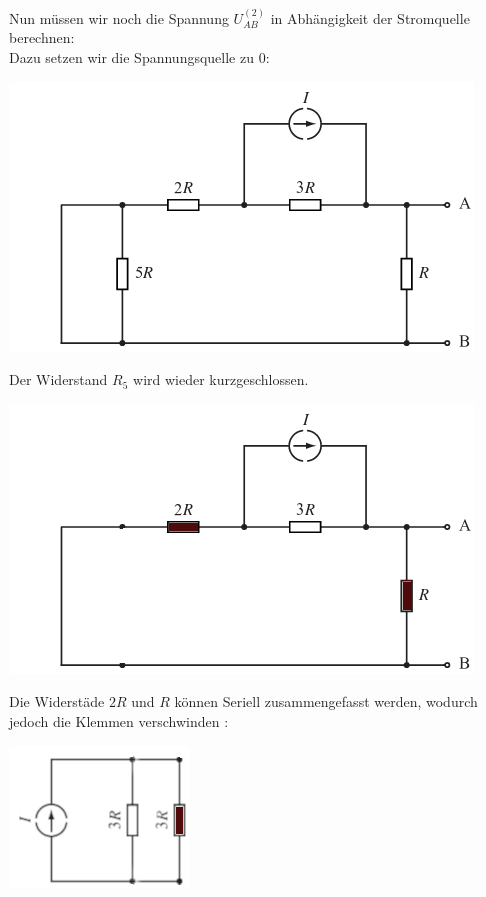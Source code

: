 Nun müssen wir noch die Spannung $U_{AB}^{(2)}$ in Abhängigkeit der Stromquelle berechnen: \\
Dazu setzen wir die Spannungsquelle zu 0:
\begin{center}
  \includegraphics[scale=1.5]{katalog/katalog-1/iu-1.png}
\end{center}
Der Widerstand $R_5$ wird wieder kurzgeschlossen.
\begin{center}
  \includegraphics[scale=1.5]{katalog/katalog-1/iu-2.png}
\end{center}
Die Widerstäde $2R$ und $R$ können Seriell zusammengefasst werden, wodurch jedoch die Klemmen verschwinden :
\begin{center}
  \includegraphics[scale=2.0]{katalog/katalog-1/iu-3.png} \\
\end{center}

